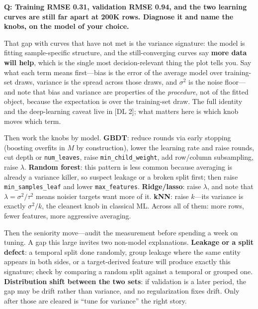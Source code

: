 \begin{interviewq}
\textbf{Q: Training RMSE 0.31, validation RMSE 0.94, and the two learning curves are still far apart at 200K rows. Diagnose it and name the knobs, on the model of your choice.}

 \quad {} \quad \badgefreq{\freqhigh}

\stronganswer

That gap with curves that have not met is the variance signature: the model is fitting sample-specific structure, and the still-converging curves say \textbf{more data will help}, which is the single most decision-relevant thing the plot tells you. Say what each term means first---bias is the error of the average model over training-set draws, variance is the spread across those draws, and $\sigma^2$ is the noise floor---and note that bias and variance are properties of the \textit{procedure}, not of the fitted object, because the expectation is over the training-set draw. The full identity and the deep-learning caveat live in [DL 2]; what matters here is which knob moves which term.

Then work the knobs by model. \textbf{GBDT}: reduce rounds via early stopping (boosting overfits in $M$ by construction), lower the learning rate and raise rounds, cut depth or \texttt{num\_leaves}, raise \texttt{min\_child\_weight}, add row/column subsampling, raise $\lambda$. \textbf{Random forest}: this pattern is less common because averaging is already a variance killer, so suspect leakage or a broken split first; then raise \texttt{min\_samples\_leaf} and lower \texttt{max\_features}. \textbf{Ridge/lasso}: raise $\lambda$, and note that $\lambda = \sigma^2/\tau^2$ means noisier targets want more of it. \textbf{kNN}: raise $k$---its variance is exactly $\sigma^2/k$, the cleanest knob in classical ML. Across all of them: more rows, fewer features, more aggressive averaging.

Then the seniority move---audit the measurement before spending a week on tuning. A gap this large invites two non-model explanations. \textbf{Leakage or a split defect}: a temporal split done randomly, group leakage where the same entity appears in both sides, or a target-derived feature will produce exactly this signature; check by comparing a random split against a temporal or grouped one. \textbf{Distribution shift between the two sets}: if validation is a later period, the gap may be drift rather than variance, and no regularization fixes drift. Only after those are cleared is ``tune for variance'' the right story.


\end{interviewq}
